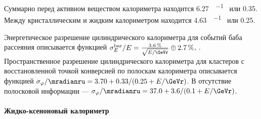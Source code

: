 Суммарно перед активном веществом калориметра находится 
\SI{6.27}{\gr \per \cubed \cmr} или \SI{0.35}{\Xrad}.
Между кристаллическим и жидким калориметром находится 
\SI{4.63}{\gr \per \cubed \cmr} или \SI{0.25}{\Xrad}.

Энергетическое разрешение цилиндрического калориметра для событий баба рассеяния описывается функцией
$\sigma_E^{\text{bar}} / E = \frac{ \SI{3.6}{\percent} }{ \sqrt{ E / \si{\GeVr} } } \oplus \SI{2.7}{\percent}$,
\cite{Anisenkov:2017pgv}.
Пространственное разрешение цилиндрического калориметра для кластеров с восстановленной точкой конверсией по полоскам  калориметра описывается функцией
$\sigma_{\varphi} / \si{\mradianru} = 3.70 + 0.33 / (0.25 + E / \si{\GeVr})$.
В отсутствие полосковой информации
---
$\sigma_{\varphi} / \si{\mradianru} = 37.0 + 3.6 / (0.1 + E / \si{\GeVr})$.



\paragraph{Жидко-ксеноновый калориметр}
\label{sec:lxe}

